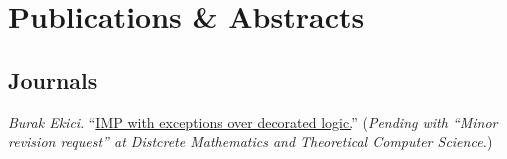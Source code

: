 \documentclass[12pt, a4paper]{article}
\newcommand{\years}[1]{\marginnote{\scriptsize #1}}
\begin{document}
\section*{Publications \& Abstracts}
\subsection*{Journals}
\years{\normalsize2017}
\emph{Burak Ekici}.
``\href{https://hal.archives-ouvertes.fr/hal-01132831v7/document}{IMP with exceptions over decorated logic.}''
(\emph{Pending with ``Minor revision request'' at Distcrete Mathematics and Theoretical Computer Science.})
\end{document}
